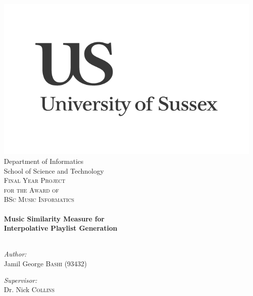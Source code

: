 \begin{titlepage}
\begin{center}
\texttt{}\\
\includegraphics[width=0.5\linewidth]{front/images/us-logo}\\
\small Department of Informatics\\
School of Science and Technology\\[2cm]

\textsc{\Large Final Year Project\\[0.1cm]
\small for the Award of\\[0.2cm]
\Large BSc Music Informatics}\\[1cm]

\hrulefill \\[0.8cm]
{ \huge \bfseries Music Similarity Measure for\\
Interpolative Playlist Generation}\\[0.8cm]

\hrulefill \\[2.5cm]
\begin{minipage}{0.45\textwidth}
\begin{flushleft} \large
\emph{Author:}\\
Jamil George \textsc{Bashi} (93432)
\end{flushleft}
\end{minipage}
\begin{minipage}{0.45\textwidth}
\begin{flushright} \large
\emph{Supervisor:} \\
Dr. Nick \textsc{Collins}
\end{flushright}
\end{minipage}
\vspace{25cm}

\end{center}
\end{titlepage}
